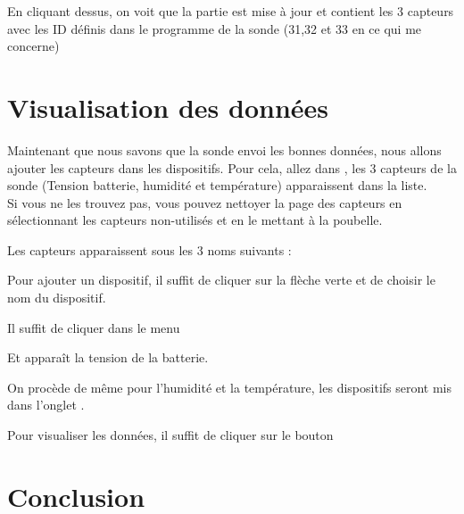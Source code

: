 En cliquant dessus, on voit que la partie  est mise à jour et contient les 3 capteurs avec les ID définis dans le programme de la sonde (31,32 et 33 en ce qui me concerne)



\section{Visualisation des données}

Maintenant que nous savons que la sonde envoi les bonnes données, nous allons ajouter les capteurs dans les dispositifs.
Pour cela, allez dans , les 3 capteurs de la sonde (Tension batterie, humidité et température) apparaissent dans la liste.\\
Si vous ne les trouvez pas, vous pouvez nettoyer la page des capteurs en sélectionnant les capteurs non-utilisés et en le mettant à la poubelle.


Les capteurs apparaissent sous les 3 noms suivants : 


Pour ajouter un dispositif, il suffit de cliquer sur la flèche verte et de choisir le nom du dispositif.



Il suffit de cliquer dans le menu 


Et apparaît la tension de la batterie.


On procède de même pour l'humidité et la température, les dispositifs seront mis dans l'onglet  .



Pour visualiser les données, il suffit de cliquer sur le bouton 


\section{Conclusion}

